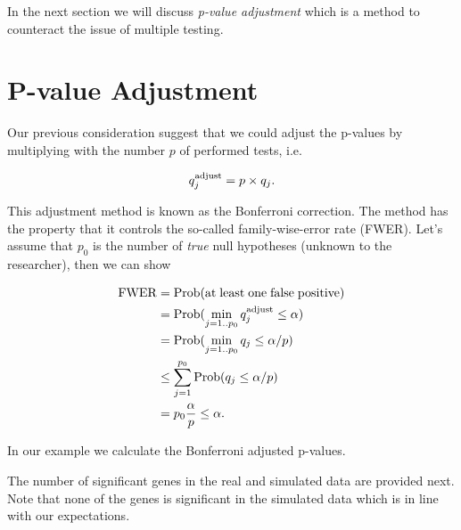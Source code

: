 \documentclass[
]{book}
\newenvironment{Shaded}{\begin{snugshade}}{\end{snugshade}}
\newcommand{\FloatTok}[1]{\textcolor[rgb]{0.00,0.00,0.81}{#1}}
\newcommand{\FunctionTok}[1]{\textcolor[rgb]{0.00,0.00,0.00}{#1}}
\newcommand{\NormalTok}[1]{#1}
\newcommand{\OtherTok}[1]{\textcolor[rgb]{0.56,0.35,0.01}{#1}}
\newcommand{\SpecialCharTok}[1]{\textcolor[rgb]{0.00,0.00,0.00}{#1}}
\begin{document}
In the next section we will discuss \emph{p-value adjustment} which is a method to counteract the issue of multiple testing.

\hypertarget{p-value-adjustment}{%
\section{P-value Adjustment}\label{p-value-adjustment}}

Our previous consideration suggest that we could adjust the p-values by multiplying with the number \(p\) of performed tests, i.e.

\[q_{j}^{\rm adjust}=p\times q_j.\]

This adjustment method is known as the Bonferroni correction. The method has the property that it controls the so-called family-wise-error rate (FWER). Let's assume that \(p_0\) is the number of \emph{true} null hypotheses (unknown to the researcher), then we can show

\begin{align*}
{\rm FWER}&={\rm Prob}({\rm at\;least\;one\;false\;positive})\\
&={\rm Prob}(\min_{j=1..p_0} q^{\rm adjust}_j\leq \alpha)\\
&={\rm Prob}(\min_{j=1..p_0} q_j\leq \alpha/p)\\
&\leq \sum_{j=1}^{p_0} {\rm Prob}(q_j\leq \alpha/p)\\
&={p_0}\frac{\alpha}{p}\leq\alpha.
\end{align*}

In our example we calculate the Bonferroni adjusted p-values.

\begin{Shaded}
\end{Shaded}

The number of significant genes in the real and simulated data are provided next. Note that none of the genes is significant in the simulated data which is in line with our expectations.

\begin{Shaded}
\end{Shaded}
\end{document}
